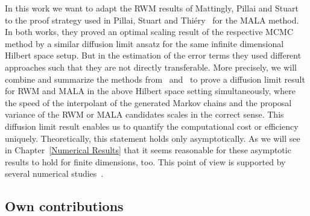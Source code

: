 In this work we want to adapt the RWM results of Mattingly, Pillai and Stuart~\autocite{Mattingly2010} to the proof strategy used in Pillai, Stuart and Thi\'{e}ry~\autocite{Pillai2012} for the MALA method. In both works, they proved an optimal scaling result of the respective MCMC method by a similar diffusion limit ansatz for the same infinite dimensional Hilbert space setup. But in the estimation of the error terms they used different approaches such that they are not directly transferable. More precisely, we will combine and summarize the methods from~\autocite{Mattingly2010} and~\autocite{Pillai2012} to prove a diffusion limit result for RWM and MALA in the above Hilbert space setting simultaneously, where the speed of the interpolant of the generated Markov chains and the proposal variance of the RWM or MALA candidates scales in the correct sense. This diffusion limit result enables us to quantify the computational cost or efficiency uniquely. Theoretically, this statement holds only asymptotically. As we will see in Chapter~\ref{Numerical Results} that it seems reasonable for these asymptotic results to hold for finite dimensions, too. This point of view is supported by several numerical studies~\autocite{Beskos2008, Gelman1996, Roberts2001}.



\subsection*{Own contributions}

